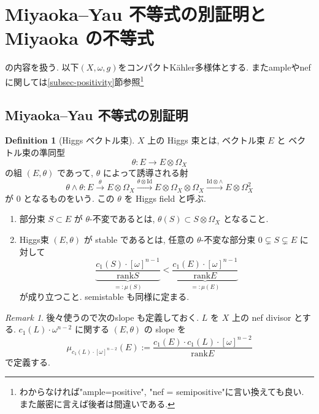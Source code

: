 \documentclass[dvipdfmx,a4paper,11pt]{article} %
\theoremstyle{definition}
\newtheorem{defn}[thm]{Definition}
\theoremstyle{remark}
\newtheorem{rem}[thm]{Remark}
\numberwithin{equation}{section}
\begin{document}
\newpage

\section{Miyaoka--Yau 不等式の別証明と Miyaoka の不等式}
\label{sec-Miyaoka}
\cite{Miy87, Cao13, Ou23, IM22, IMM24}の内容を扱う. 
以下$(X, \omega, g)$をコンパクトK\"ahler多様体とする. 
またampleやnefに関しては\ref{subsec-positivity}節参照\footnote{わからなければ"ample=positive", "nef = semipositive"に言い換えても良い. また厳密に言えば後者は間違いである. }

\subsection{Miyaoka--Yau 不等式の別証明}

\begin{defn}[Higgs ベクトル束]
\(X\) 上の Higgs 束とは, ベクトル束 \(E\) と 
ベクトル束の準同型
\[
\theta\colon E\longrightarrow E\otimes \Omega_X
\]
の組 \((E,\theta)\) であって, \(\theta\) によって誘導される射
\[
\theta\wedge\theta\colon 
E
\overset{\theta}{\longrightarrow }E\otimes \Omega_X
\overset{\theta \otimes \mathrm{Id}}{\longrightarrow }E\otimes \Omega_X \otimes \Omega_X
\overset{\mathrm{Id} \otimes \wedge}{\longrightarrow }
E\otimes \Omega_X^2
\]
が \(0\) となるものをいう. この \(\theta\) を Higgs field と呼ぶ.

\begin{enumerate}
\item 部分束 \(S\subset E\) が \(\theta\)-不変であるとは,
\(
\theta(S) \subset  
S\otimes \Omega_X
\)
となること. 
\item Higgs束 \((E,\theta)\) が stable であるとは, 任意の \(\theta\)-不変な部分束
\(
0\subsetneq S\subsetneq E
\)
に対して
\[
\underbrace{\frac{c_1(S)\cdot [\omega]^{n-1}}{\mathrm{rank}S}}_{=:\mu(S)}
<
\underbrace{\frac{c_1(E)\cdot [\omega]^{n-1}}{\mathrm{rank}E}}_{=:\mu(E)}
\]
が成り立つこと. 
semistable も同様に定まる. 
\end{enumerate}
\end{defn}
\begin{rem}
後々使うので次のslope も定義しておく. 
\(L\) を \(X\) 上の nef  divisor とする. \(c_1(L) \cdot  \omega^{n-2}\) に関する \((E,\theta)\) の slope を
\[
\mu_{c_1(L) \cdot  [\omega]^{n-2}}(E)
:=
\frac{c_1(E)\cdot c_1(L) \cdot [\omega]^{n-2}}{\mathrm{rank}E}
\]
で定義する.
\end{rem}
\end{document}
